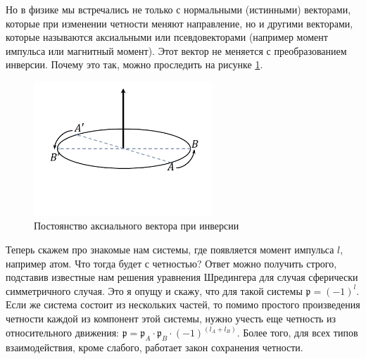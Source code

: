 \documentclass[12pt]{article}
\begin{document}
\vspace{1em} \noindent
Но в физике мы встречались не только с нормальными (истинными) векторами, которые при изменении четности меняют направление, но и другими векторами, которые называются аксиальными или псевдовекторами (например момент импульса или магнитный момент). Этот вектор не меняется с преобразованием инверсии. Почему это так, можно проследить на рисунке \ref{fig:sem_08_pic_1}.
\begin{figure}[h]
    \centering
    \includegraphics[width=0.6\textwidth,height=\textheight,keepaspectratio]{Seminar_08/pics/pic_01.pdf}
    \caption{Постоянство аксиального вектора при инверсии}
    \label{fig:sem_08_pic_1}
\end{figure}

\vspace{1em} \noindent
Теперь скажем про знакомые нам системы, где появляется момент импульса $l$, например атом. Что тогда будет с четностью? Ответ можно получить строго, подставив известные нам решения уравнения Шредингера для случая сферически симметричного случая. Это я опущу и скажу, что для такой системы $\mathfrak{p} = (-1)^l$. Если же система состоит из нескольких частей, то помимо простого произведения четности каждой из компонент этой системы, нужно учесть еще четность из относительного движения: $\mathfrak{p} = \mathfrak{p}_A\cdot\mathfrak{p}_B\cdot (-1)^{(l_A+l_B)}$. Более того, для всех типов взаимодействия, кроме слабого, работает закон сохранения четности. 
\end{document}
